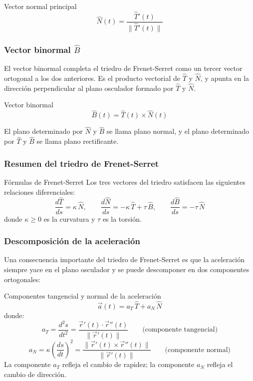 \begin{mydefinition}{Vector normal principal}
\[ \hat{N}(t) = \frac{\hat{T}'(t)}{\|\hat{T}'(t)\|} \]
\end{mydefinition}

\subsubsection{Vector binormal $\hat{B}$}

El vector binormal completa el triedro de Frenet-Serret como un tercer vector ortogonal a los dos anteriores. Es el producto vectorial de $\hat{T}$ y $\hat{N}$, y apunta en la dirección perpendicular al plano osculador formado por $\hat{T}$ y $\hat{N}$.

\begin{mydefinition}{Vector binormal}
\[ \hat{B}(t) = \hat{T}(t) \times \hat{N}(t) \]
\end{mydefinition}

El plano determinado por $\hat{N}$ y $\hat{B}$ se llama plano normal, y el plano determinado por $\hat{T}$ y $\hat{B}$ se llama plano rectificante.

\subsubsection{Resumen del triedro de Frenet-Serret}

\begin{mytheorem}{Fórmulas de Frenet-Serret}
Los tres vectores del triedro satisfacen las siguientes relaciones diferenciales:
\[
\frac{d\hat{T}}{ds} = \kappa\,\hat{N}, \qquad
\frac{d\hat{N}}{ds} = -\kappa\,\hat{T} + \tau\,\hat{B}, \qquad
\frac{d\hat{B}}{ds} = -\tau\,\hat{N}
\]
donde $\kappa \geq 0$ es la curvatura y $\tau$ es la torsión.
\end{mytheorem}

\subsubsection{Descomposición de la aceleración}

Una consecuencia importante del triedro de Frenet-Serret es que la aceleración siempre yace en el plano osculador y se puede descomponer en dos componentes ortogonales:

\begin{mytheorem}{Componentes tangencial y normal de la aceleración}
\[ \vec{a}(t) = a_T\,\hat{T} + a_N\,\hat{N} \]
donde:
\[ a_T = \frac{d^2s}{dt^2} = \frac{\vec{r}'(t) \cdot \vec{r}''(t)}{\|\vec{r}'(t)\|} \qquad \text{(componente tangencial)} \]
\[ a_N = \kappa \left(\frac{ds}{dt}\right)^2 = \frac{\|\vec{r}'(t) \times \vec{r}''(t)\|}{\|\vec{r}'(t)\|} \qquad \text{(componente normal)} \]
La componente $a_T$ refleja el cambio de rapidez; la componente $a_N$ refleja el cambio de dirección.
\end{mytheorem}

